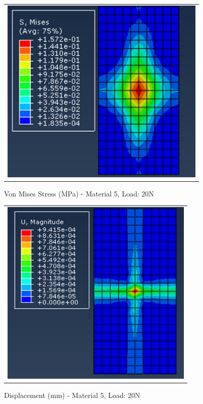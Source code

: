 \documentclass[a4paper,12pt]{article}
\numberwithin{equation}{section}
\numberwithin{figure}{section}
\begin{document}
\begin{figure}[H]
  \centering
  \begin{tabular}{@{}c@{}}
    \includegraphics[width=0.7\linewidth,height=255pt]{Results/Point Loading/M5_VMS_L4.png} \\
  \end{tabular}
  \caption{Von Mises Stress (MPa) - Material 5, Load: 20N}
\end{figure}

\begin{figure}[H]
  \centering
  \begin{tabular}{@{}c@{}}
    \includegraphics[width=0.7\linewidth,height=255pt]{Results/Point Loading/M5_DIS_L4.png} \\
  \end{tabular}
  \caption{Displacement (mm) - Material 5, Load: 20N}
\end{figure}
\end{document}
